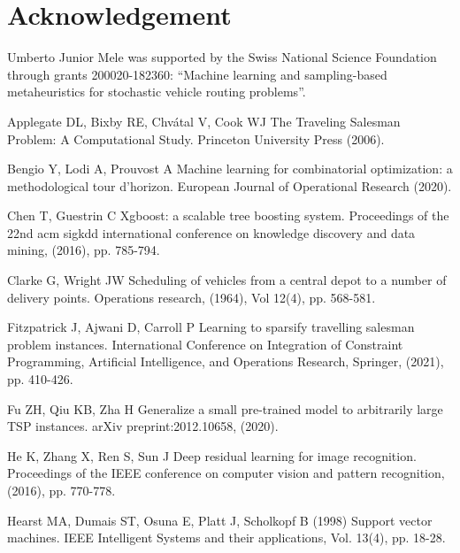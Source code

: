 \documentclass{article}
\begin{document}
\section*{Acknowledgement}
Umberto Junior Mele was supported by the Swiss National Science Foundation
through grants 200020-182360: ``Machine learning and sampling-based metaheuristics for stochastic vehicle routing problems''.



% 

\begin{thebibliography}{99}

Applegate DL, Bixby RE, Chvátal V, Cook WJ 
\newblock The Traveling Salesman Problem: A Computational Study.
\newblock Princeton University Press (2006).


Bengio Y, Lodi A, Prouvost A 
\newblock Machine learning for combinatorial optimization: a methodological tour d’horizon.
\newblock European Journal of Operational Research (2020).

Chen T, Guestrin C
\newblock Xgboost: a scalable tree boosting system.
\newblock Proceedings of the 22nd acm sigkdd international conference on knowledge discovery and data mining, (2016), pp. 785-794.

Clarke G, Wright JW 
\newblock Scheduling of vehicles from a central depot to a number of delivery points.
\newblock Operations research, (1964), Vol 12(4), pp. 568-581.

Fitzpatrick J, Ajwani D, Carroll P 
\newblock Learning to sparsify travelling salesman problem instances.
\newblock International Conference on Integration of Constraint Programming, Artificial Intelligence, and Operations Research, Springer, (2021), pp. 410-426.

Fu ZH, Qiu KB, Zha H
\newblock Generalize a small pre-trained model to arbitrarily large TSP instances.
\newblock arXiv preprint:2012.10658, (2020).

He K, Zhang X, Ren S, Sun J
\newblock Deep residual learning for image recognition. 
\newblock Proceedings of the IEEE conference on computer vision and pattern recognition, (2016), pp. 770-778.

Hearst MA, Dumais ST, Osuna E, Platt J, Scholkopf B (1998)
\newblock Support vector machines.
\newblock IEEE Intelligent Systems and their applications, Vol. 13(4), pp. 18-28.



\end{thebibliography}
\end{document}
